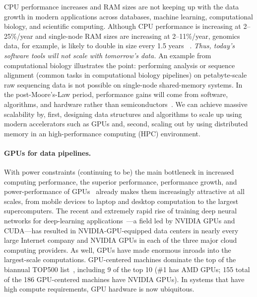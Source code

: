  CPU
performance increases and RAM sizes are not keeping up with the data growth in
modern applications across databases, machine learning, computational biology,
and scientific computing. Although CPU performance is increasing at
2--25\%/year and single-node RAM sizes are increasing at 2--11\%/year, genomics
data, for example, is likely to double in size every 1.5 years~\cite{kodama2012sequence} .
\emph{Thus, today's software tools will not scale with tomorrow's data.} An example from computational biology illustrates the point: performing \kmer analysis or sequence alignment (common tasks in
computational biology pipelines) on petabyte-scale raw sequencing data is not
possible on single-node shared-memory systems. In the post-Moore’s-Law period,
performance gains will come from software, algorithms, and hardware rather than
semiconductors~\cite{leiserson2020there}. We can achieve massive scalability by,
first, designing data structures and algorithms to scale up using modern
accelerators such as GPUs and, second, scaling out by using distributed memory
in an high-performance computing (HPC) environment.

\paragraph{GPUs for data pipelines.} With power constraints (continuing to be) the main bottleneck in increased
computing performance, the superior performance, performance growth, and
power-performance of GPUs~\cite{Dally:2010:GCT,Dally:2021:EOT} already makes
them increasingly attractive at all scales, from mobile devices to laptop and
desktop computation to the largest supercomputers. The recent and extremely
rapid rise of training deep neural networks for deep-learning
applications~\cite{Amodei:2015:DS2,Chetlur:2014:CEP,Coates:2013:DLW,Hannun:2014:DSU}---a
field led by NVIDIA GPUs and CUDA---has resulted in NVIDIA-GPU-equipped data
centers in nearly every large Internet company and NVIDIA GPUs in each of the
three major cloud computing providers. As well, GPUs have made enormous inroads
into the largest-scale computations. GPU-centered machines dominate the top of
the biannual TOP500 list~\cite{top500:jun2024}, including 9 of the top 10 (\#1
has AMD GPUs; 155 total of the 186 GPU-centered machines have NVIDIA GPUs). In
systems that have high compute requirements, GPU hardware is now ubiquitous. 
%
%

